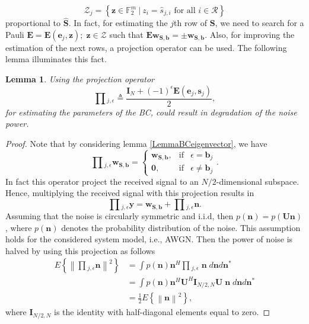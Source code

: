 \documentclass[lettersize,journal,onecolumn]{IEEEtran}
\newtheorem{lemma}{Lemma}
\begin{document}
\begin{equation}\label{symetConds}
	\mathcal{Z}_j = \left\{ \mathbf{z}\in \mathbb{F}_2^m \: | \: z_i = \widehat{s}_{j,i} \text{ for all } i \in \mathcal{R} \right\}
\end{equation}
proportional to $\widehat{\mathbf{S}}$. In fact, for estimating the $j$th row of $\mathbf{S}$, we need to search for a Pauli $\mathbf{E}=\mathbf{E}\left(\mathbf{e}_j, \mathbf{z}\right); \; \mathbf{z}\in \mathcal{Z}$ such that $\mathbf{E}\mathbf{w}_{\mathbf{S, b}} = \pm \mathbf{w}_{\mathbf{S, b}}$. Also, for improving the estimation of the next rows, a projection operator can be used. The following lemma illuminates this fact.
\begin{lemma}
	Using the projection operator
	 \begin{equation}
	 	\prod{_{j, \epsilon}} \triangleq \frac{\mathbf{I}_N+(-1)^{\epsilon} \mathbf{E}\left(\mathbf{e}_j, \mathbf{s}_j\right)}{2},
	 \end{equation}
for estimating the parameters of the BC, could result in degradation of the noise power.
\end{lemma}
\begin{proof}
	Note that by considering lemma \ref{LemmaBCeigenvector}, we have
	\begin{equation}
		\prod{_{j, \epsilon}} \mathbf{w}_{\mathbf{S, b}} = \left\{
		\begin{array}{lll}
			\mathbf{w}_{\mathbf{S, b}}, & \text{if} & \epsilon = \mathbf{b}_j \\
			\mathbf{0}, & \text{if} & \epsilon \neq \mathbf{b}_j
		\end{array}
		 \right. .
	\end{equation}
In fact this operator project the received signal to an $N/2$-dimensional subspace. Hence, multiplying the received signal with this projection results in
\begin{equation}
	\prod{_{j, \epsilon}} \mathbf{y} = \mathbf{w}_{\mathbf{S,b}} + \prod{_{j, \epsilon}} \mathbf{n} .
\end{equation}
Assuming that the noise is circularly symmetric and $\text{i.i.d}$, then $p\left(\mathbf{n}\right) = p\left(\mathbf{U n}\right)$, where $p\left(\mathbf{n}\right)$ denotes the probability distribution of the noise. This assumption holds for the considered system model, i.e., AWGN. Then the power of noise is halved by using this projection as follows
\begin{align}
	E\left\{ \left\lVert \prod{_{j, \epsilon}} \mathbf{n} \right\rVert^2 \right\}& = \int{p\left(\mathbf{n}\right) \mathbf{n}^H \prod{_{j, \epsilon}} \; \mathbf{n}\; d\mathbf{n} d\mathbf{n}^*} \nonumber \\
	& = \int{p(\mathbf{n}) \mathbf{n}^H \mathbf{U}^H \mathbf{I}_{N/2, N} \mathbf{U} \; \mathbf{n} \; d\mathbf{n} d\mathbf{n}^*} \nonumber \\
	&= \frac{1}{2}E\left\{\left\lVert \mathbf{n} \right\rVert^2 \right\},
\end{align}  
where $\mathbf{I}_{N/2, N}$ is the identity with half-diagonal elements equal to zero. 
\end{proof}
\end{document}
